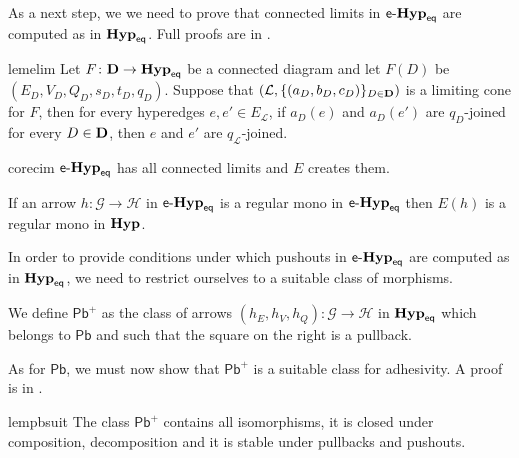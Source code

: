 \documentclass[3p]{elsarticle}
\newcommand{\pbc}{\mathsf{Pb}}
\newcommand{\pbp}{\mathsf{Pb}^{+}}
\newcommand{\eq}{\mathsf{eq}}
\def\D{\textbf {\textup{D}}}
\newcommand{\catname}[1]{\textbf{\textup{#1}}}
\newcommand{\hyp}{\catname{Hyp}}
\newcommand{\EqHyp}{\catname{Hyp}_{\mathsf{eq}}} %
\newcommand{\egg}{\mathsf{e}\text{-}\catname{Hyp}_\eq}
\theoremstyle{remark}
\theoremstyle{definition}
\begin{document}
As a next step, we we need to prove that connected limits in $\egg$ are computed as in $\EqHyp$. Full proofs are in .

\begin{restatable}{lem}{elim}\label{lem:elimc}
Let $F\colon \D\to \hyp_{\eq}$ be a connected diagram and let $F(D)$ be $(E_D, V_D, Q_D, s_D, t_D, q_D)$. Suppose that $(\mathcal{L}, \{(a_D, b_D, c_D)\}_{D\in \D})$ is a limiting cone for $F$, then for every hyperedges $e,e'\in E_{\mathcal{L}}$, if $a_D(e)$ and $a_D(e')$ are $q_D$-joined for every $D\in \D$, then $e$ and $e'$ are $q_{\mathcal{L}}$-joined.
\end{restatable}

\begin{restatable}{cor}{ecim}\label{lem:elim}
	$\egg$ has all connected limits and $E$ creates them.
\end{restatable}

\begin{cor}\label{cor:ereg}
	If an arrow $h: \mathcal{G \to H}$ in $\egg$ is a regular mono in $\egg$ then $E(h)$ is a regular mono in $\hyp$. 
\end{cor}

In order to provide conditions under which pushouts in $\egg$ are computed as in $\EqHyp$, we need to restrict ourselves to a suitable class of morphisms.

\noindent
\begin{minipage}[l]{.83\linewidth}
	\begin{defi}
	We define $\pbp$ as the class of arrows $(h_E, h_V, h_Q)\colon \mathcal{G}\to \mathcal{H}$ in $\EqHyp$ which belongs to $\pbc$ and such that the square on the right is a pullback.
\end{defi}
\end{minipage} \hfill 
\begin{minipage}[r]{.15\linewidth}
\end{minipage}

\vspace{.1cm}
As for $\pbc$, we must now show that $\pbp$ is a suitable class for adhesivity. A proof is in .

\begin{restatable}{lem}{pbsuit}\label{lem:pbmonoplus}
The class $\pbp$ contains all isomorphisms, it is closed under composition, decomposition and it is stable under pullbacks and pushouts.
\end{restatable}
\end{document}
